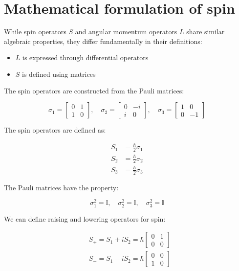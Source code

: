 \section{Mathematical formulation of spin}
While spin operators $S$ and angular momentum operators $L$ share similar algebraic properties, they differ fundamentally in their definitions:

\begin{itemize}
  \item $L$ is expressed through differential operators
  \item $S$ is defined using matrices
\end{itemize}

The spin operators are constructed from the Pauli matrices:

\[
\sigma_{1}=\left[\begin{array}{ll}
0 & 1  \\
1 & 0
\end{array}\right], \quad \sigma_{2}=\left[\begin{array}{cc}
0 & -i \\
i & 0
\end{array}\right], \quad \sigma_{3}=\left[\begin{array}{cc}
1 & 0 \\
0 & -1
\end{array}\right]
\]

The spin operators are defined as:

\begin{align}
S_{1} & =\frac{\hbar}{2} \sigma_{1} \\
S_{2} & =\frac{\hbar}{2} \sigma_{2}  \\
S_{3} & =\frac{\hbar}{2} \sigma_{3}
\end{align}

The Pauli matrices have the property:

\begin{equation}
\sigma_{1}^{2}=\mathbb{I}, \quad \sigma_{2}^{2}=\mathbb{I}, \quad \sigma_{3}^{2}=\mathbb{I}
\end{equation}

We can define raising and lowering operators for spin:

\begin{align}
& S_{+}=S_{1}+i S_{2}=\hbar\left[\begin{array}{ll}
0 & 1 \\
0 & 0
\end{array}\right] \\
& S_{-}=S_{1}-i S_{2}=\hbar\left[\begin{array}{ll}
0 & 0 \\
1 & 0
\end{array}\right]
\end{align}


